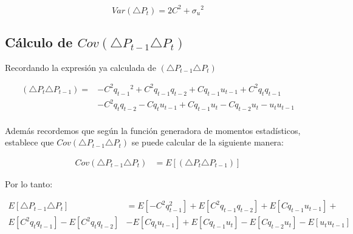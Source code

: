 \documentclass[a4paper]{article}
\begin{document}
\begin{equation}\label{Varianza}
	\boxed{ Var(\triangle{P}_{t}) = 2{C}^{2} + {{\sigma}_{u}}^{2} }
\end{equation}

\newpage
\subsection*{C\'alculo de $Cov(\triangle{P}_{t-1}\triangle{P}_{t})$} 

Recordando la expresi\'on ya calculada de $(\triangle{P}_{t-1}\triangle{P}_{t})$

\begin{equation}
\begin{aligned}
	(\triangle{P}_{t}\triangle{P}_{t-1}) = &-{C}^{2}{{q}_{t-1}}^{2} + {C}^{2}{q}_{t-1}{q}_{t-2} + 
    C{q}_{t-1}{u}_{t-1} + {C}^{2}{q}_{t}{q}_{t-1} \\ 
    & - {C}^{2}{q}_{t}{q}_{t-2}  - C{q}_{t}{u}_{t-1} + C{q}_{t-1}{u}_{t} - 
    C{q}_{t-2}{u}_{t} - {u}_{t}{u}_{t-1}
\end{aligned}
\end{equation}
\\

Adem\'as recordemos que seg\'un la funci\'on generadora de momentos estad\'isticos, establece que $Cov(\triangle{P}_{t-1}\triangle{P}_{t})$ se puede calcular de la siguiente manera:

\begin{equation}
\begin{aligned}
	Cov(\triangle{P}_{t-1}\triangle{P}_{t}) &= E \left[ (\triangle{P}_{t}\triangle{P}_{t-1}) \right]
\end{aligned}
\end{equation}

Por lo tanto: 

\begin{equation}
\begin{aligned}
 E \left[ \triangle{P}_{t-1}\triangle{P}_{t} \right] &=  E\left[ -{C}^{2}{{q}}^{2}_{t-1} \right] + 
    E\left[ {C}^{2}{q}_{t-1}{q}_{t-2} \right] + E\left[ C{q}_{t-1}{u}_{t-1} \right] + \\
    E\left[ {C}^{2}{q}_{t}{q}_{t-1} \right] - E\left[ {C}^{2}{q}_{t}{q}_{t-2} \right]  
    &- E\left[ C{q}_{t}{u}_{t-1} \right] + E\left[ C{q}_{t-1}{u}_{t} \right] - 
    E\left[ C{q}_{t-2}{u}_{t} \right] - E\left[ {u}_{t}{u}_{t-1} \right]
\end{aligned}
\end{equation}
\\
\end{document}

